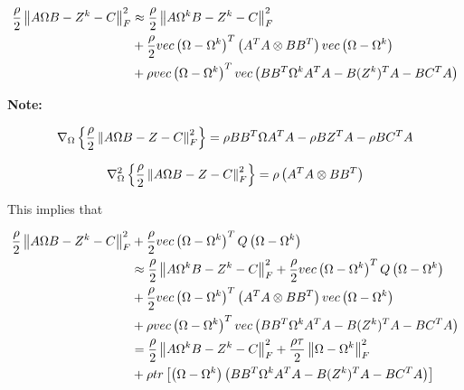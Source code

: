 \documentclass[11pt,]{report}
\begin{document}
\begin{equation}
\begin{split}
  \frac{\rho}{2}\left\| A\Omega B - Z^{k} - C \right\|_{F}^{2} &\approx \frac{\rho}{2}\left\| A\Omega^{k} B - Z^{k} - C \right\|_{F}^{2} \\
  &+ \frac{\rho}{2}vec\left( \Omega - \Omega^{k}\right)^{T}\left(A^{T}A \otimes BB^{T}\right)vec\left(\Omega - \Omega^{k}\right) \\
  &+ \rho vec\left(\Omega - \Omega^{k}\right)^{T}vec\left(BB^{T}\Omega^{k}A^{T}A - B(Z^{k})^{T}A - BC^{T}A \right)
\label{eq:taylors}\notag
\end{split}
\end{equation}

\textbf{Note:}

\begin{equation}
  \nabla_{\Omega}\left\{ \frac{\rho}{2}\left\|A\Omega B - Z - C\right\|_{F}^{2} \right\} = \rho BB^{T}\Omega A^{T}A - \rho BZ^{T}A - \rho BC^{T}A
\label{eq:gradient}\notag
\end{equation}

\begin{equation}
\nabla_{\Omega}^{2}\left\{ \frac{\rho}{2}\left\|A\Omega B - Z - C \right\|_{F}^{2} \right\} = \rho\left(A^{T}A \otimes BB^{T} \right)
\label{eq:hessian}\notag
\end{equation}

This implies that

\begin{equation}
\begin{split}
  \frac{\rho}{2}\left\| A\Omega B - Z^{k} - C \right\|_{F}^{2} &+ \frac{\rho}{2}vec\left(\Omega - \Omega^{k} \right)^{T}Q\left(\Omega - \Omega^{k} \right) \\
  &\approx \frac{\rho}{2}\left\| A\Omega^{k} B - Z^{k} - C \right\|_{F}^{2} + \frac{\rho}{2}vec\left(\Omega - \Omega^{k} \right)^{T}Q\left(\Omega - \Omega^{k} \right) \\
  &+ \frac{\rho}{2}vec\left( \Omega - \Omega^{k}\right)^{T}\left(A^{T}A \otimes BB^{T}\right)vec\left(\Omega - \Omega^{k}\right) \\
  &+ \rho vec\left(\Omega - \Omega^{k}\right)^{T}vec\left(BB^{T}\Omega^{k}A^{T}A - B(Z^{k})^{T}A - BC^{T}A \right) \\
  &= \frac{\rho}{2}\left\| A\Omega^{k} B - Z^{k} - C \right\|_{F}^{2} + \frac{\rho\tau}{2}\left\|\Omega - \Omega^{k}\right\|_{F}^{2} \\
  &+ \rho tr\left[\left(\Omega - \Omega^{k}\right)\left(BB^{T}\Omega^{k}A^{T}A - B(Z^{k})^{T}A - BC^{T}A \right)\right]
\label{eq:penapprox}\notag
\end{split}
\end{equation}
\end{document}
